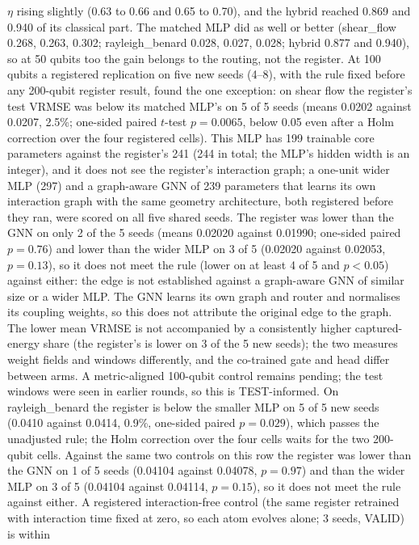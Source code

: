\documentclass{article}
\begin{document}
$\eta$ rising slightly (0.63 to 0.66 and 0.65 to 0.70), and the hybrid reached 0.869 and 0.940 of its classical part. The matched MLP did as well or better (shear\_flow 0.268, 0.263, 0.302; rayleigh\_benard 0.028, 0.027, 0.028; hybrid
0.877 and 0.940), so at 50 qubits too the gain belongs to the routing, not the register. At 100 qubits a registered
replication on five new seeds (4--8), with the rule fixed before any 200-qubit register result, found the one
exception: on shear flow the register's test VRMSE was below its matched MLP's on 5 of 5 seeds (means 0.0202 against
0.0207, 2.5\%; one-sided paired $t$-test $p=0.0065$, below 0.05 even after a Holm correction over the four registered
cells). This MLP has 199 trainable core parameters against the register's 241 (244 in total; the MLP's hidden width is an
integer), and it
does not see the register's interaction graph; a one-unit wider MLP (297) and a graph-aware GNN of 239 parameters that learns its
own interaction graph with the same geometry architecture, both registered before they ran, were scored on all five shared seeds. The register was lower than the GNN on only 2 of the 5 seeds (means 0.02020 against 0.01990; one-sided paired
$p=0.76$) and lower than the wider MLP on 3 of 5 (0.02020 against 0.02053, $p=0.13$), so it does not meet the rule (lower on
at least 4 of 5 and $p<0.05$) against either: the edge is not established against a graph-aware GNN of similar size or a wider MLP.
The GNN learns its own graph and router and normalises its coupling weights, so this does not attribute the original
edge to the graph. The lower mean VRMSE is not accompanied by a
consistently higher captured-energy share (the register's is lower on 3 of the 5 new seeds); the two measures weight
fields and windows differently, and the co-trained gate and head differ between arms. A metric-aligned 100-qubit control
remains pending; the test windows were seen in
earlier rounds, so this is TEST-informed. On rayleigh\_benard the register is below the smaller MLP on 5 of 5
new seeds (0.0410 against 0.0414, 0.9\%, one-sided paired $p=0.029$), which passes the unadjusted rule; the Holm
correction over the four cells waits for the two 200-qubit cells. Against the same two controls on this row the register
was lower than the GNN on 1 of 5 seeds (0.04104 against 0.04078, $p=0.97$) and than the wider MLP on 3 of 5 (0.04104
against 0.04114, $p=0.15$), so it does not meet the rule against either. A registered interaction-free control
(the same register retrained with interaction time fixed at zero, so each atom evolves alone; 3 seeds, VALID) is within
\end{document}
